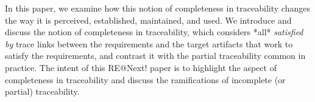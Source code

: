 In this paper, we examine how this notion of completeness in traceability changes the way it is perceived, established, maintained, and used. We introduce and discuss the notion of completeness in traceability, which considers *all* \emph{satisfied by} trace links between the requirements and the target artifacts that work to satisfy the requirements, and contrast it with the partial traceability common in practice.  The intent of this RE@Next! paper is to highlight the aspect of completeness in traceability and discuss the ramifications of incomplete (or partial) traceability. %

